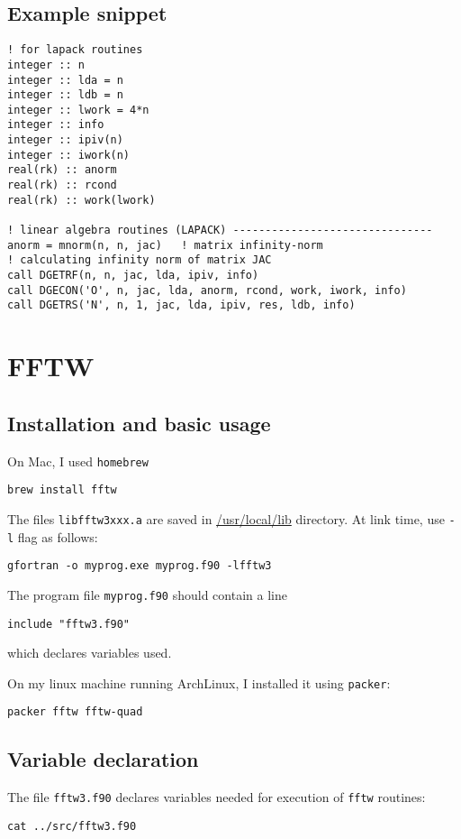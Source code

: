 \documentclass[11pt]{article}
\begin{document}
\subsection{Example snippet}
\label{sec:org0669f4f}

\begin{verbatim}
! for lapack routines
integer :: n
integer :: lda = n
integer :: ldb = n
integer :: lwork = 4*n
integer :: info
integer :: ipiv(n)
integer :: iwork(n)
real(rk) :: anorm
real(rk) :: rcond
real(rk) :: work(lwork)

! linear algebra routines (LAPACK) -------------------------------
anorm = mnorm(n, n, jac)   ! matrix infinity-norm
! calculating infinity norm of matrix JAC
call DGETRF(n, n, jac, lda, ipiv, info)
call DGECON('O', n, jac, lda, anorm, rcond, work, iwork, info)
call DGETRS('N', n, 1, jac, lda, ipiv, res, ldb, info)
\end{verbatim}

\section{FFTW}
\label{sec:orgbf523ec}
\subsection{Installation and basic usage}
\label{sec:org4ab39c8}
On Mac, I used \texttt{homebrew}
\begin{verbatim}
brew install fftw
\end{verbatim}

The files \texttt{libfftw3xxx.a} are saved in \href{file:///usr/local/lib/}{/usr/local/lib} directory. At link time, use \texttt{-l} flag as follows:
\begin{verbatim}
gfortran -o myprog.exe myprog.f90 -lfftw3
\end{verbatim}

The program file \texttt{myprog.f90} should contain a line
\begin{verbatim}
include "fftw3.f90"
\end{verbatim}
which declares variables used.

On my linux machine running ArchLinux, I installed it using \texttt{packer}:
\begin{verbatim}
packer fftw fftw-quad
\end{verbatim}

\subsection{Variable declaration}
\label{sec:org77138c2}
The file \texttt{fftw3.f90} declares variables needed for execution of \texttt{fftw} routines:
\begin{verbatim}
cat ../src/fftw3.f90
\end{verbatim}
\end{document}
